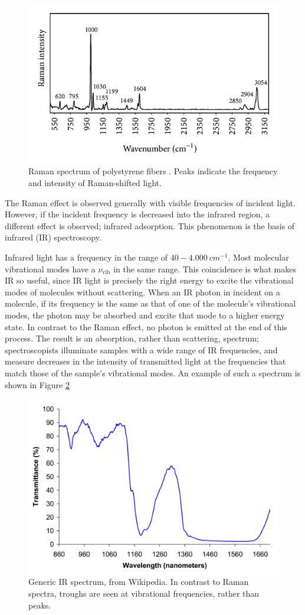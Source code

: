 \begin{figure}
\centering
\includegraphics[width=0.7\linewidth]{generic_spectrum}
\caption{Raman spectrum of polystyrene fibers \cite{RefWorks:54}. Peaks indicate the frequency and intensity of Raman-shifted light.}
\label{fig:generic_spectrum}
\end{figure}

The Raman effect is observed generally with visible frequencies of incident light. However, if the incident frequency is decreased into the infrared region, a different effect is observed; infrared adsorption. This phenomenon is the basis of infrared (IR) spectroscopy.

Infrared light has a frequency in the range of $40-\SI{4,000}{cm^{-1}}$. Most molecular vibrational modes have a $\nu_\mathrm{vib}$ in the same range. This coincidence is what makes IR so useful, since IR light is precisely the right energy to excite the vibrational modes of molecules without scattering. When an IR photon in incident on a molecule, if its frequency is the same as that of one of the molecule's vibrational modes, the photon may be absorbed and excite that mode to a higher energy state. In contrast to the Raman effect, no photon is emitted at the end of this process. The result is an absorption, rather than scattering, spectrum; spectroscopists illuminate samples with a wide range of IR frequencies, and measure decreases in the intensity of transmitted light at the frequencies that match those of the sample's vibrational modes. An example of such a spectrum is shown in Figure \ref{fig:generic_ir}

\begin{figure}
\centering
\includegraphics[width=0.8\linewidth]{generic_ir}
\caption{Generic IR spectrum, from Wikipedia. In contrast to Raman spectra, troughs are seen at vibrational frequencies, rather than peaks.}
\label{fig:generic_ir}
\end{figure}

